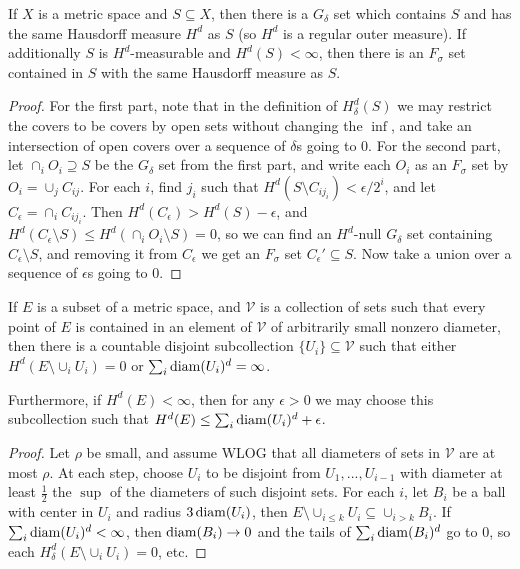 \begin{prop} If $X$ is a metric space and $S \subseteq X$, then there is a $G_\delta$ set which contains $S$ and has the same Hausdorff measure $H^d$ as $S$ (so $H^d$ is a regular outer measure). If additionally $S$ is $H^d$-measurable and $H^d(S) < \infty$, then there is an $F_\sigma$ set contained in $S$ with the same Hausdorff measure as $S$.
\end{prop}
\begin{proof} For the first part, note that in the definition of $H^d_\delta(S)$ we may restrict the covers to be covers by open sets without changing the $\inf$, and take an intersection of open covers over a sequence of $\delta$s going to $0$. For the second part, let $\cap_i O_i \supseteq S$ be the $G_\delta$ set from the first part, and write each $O_i$ as an $F_\sigma$ set by $O_i = \cup_j C_{ij}$. For each $i$, find $j_i$ such that $H^d(S\setminus C_{ij_i}) < \epsilon/2^i$, and let $C_\epsilon = \cap_i C_{ij_i}$. Then $H^d(C_\epsilon) > H^d(S) - \epsilon$, and $H^d(C_\epsilon\setminus S) \le H^d(\cap_i O_i \setminus S) = 0$, so we can find an $H^d$-null $G_\delta$ set containing $C_\epsilon\setminus S$, and removing it from $C_\epsilon$ we get an $F_\sigma$ set $C_\epsilon' \subseteq S$. Now take a union over a sequence of $\epsilon$s going to $0$.
\end{proof}

\begin{thm}\label{vitali-hausdorff} If $E$ is a subset of a metric space, and $\mathcal{V}$ is a collection of sets such that every point of $E$ is contained in an element of $\mathcal{V}$ of arbitrarily small nonzero diameter, then there is a countable disjoint subcollection $\{U_i\} \subseteq \mathcal{V}$ such that either $H^d(E\setminus \cup_i U_i) = 0$ or $\sum_i \operatorname{diam}(U_i)^d = \infty$.

Furthermore, if $H^d(E) < \infty$, then for any $\epsilon > 0$ we may choose this subcollection such that $H^d(E) \le \sum_i \operatorname{diam}(U_i)^d + \epsilon$.
\end{thm}
\begin{proof} Let $\rho$ be small, and assume WLOG that all diameters of sets in $\mathcal{V}$ are at most $\rho$. At each step, choose $U_i$ to be disjoint from $U_1, ..., U_{i-1}$ with diameter at least $\frac{1}{2}$ the $\sup$ of the diameters of such disjoint sets. For each $i$, let $B_i$ be a ball with center in $U_i$ and radius $3\operatorname{diam}(U_i)$, then $E\setminus \cup_{i \le k} U_i \subseteq \cup_{i > k} B_i$. If $\sum_i \operatorname{diam}(U_i)^d < \infty$, then $\operatorname{diam}(B_i) \rightarrow 0$ and the tails of $\sum_i \operatorname{diam}(B_i)^d$ go to $0$, so each $H^d_\delta(E\setminus \cup_i U_i) = 0$, etc.
\end{proof}

